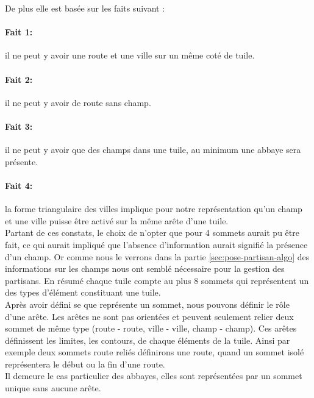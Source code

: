 \documentclass[a4paper, 11pt]{article}
\begin{document}
            De plus elle est basée sur les faits suivant : 
			\paragraph{Fait 1:}il ne peut y avoir une route et une ville sur un même coté de tuile.
			\paragraph{Fait 2:}il ne peut y avoir de route sans champ.
			\paragraph{Fait 3:}il ne peut y avoir que des champs dans une tuile, au minimum une abbaye sera présente.
			\paragraph{Fait 4:}la forme triangulaire des villes implique pour notre représentation qu'un champ et une ville puisse être activé sur la même arête d'une tuile.\\

			
			\indent Partant de ces constats, le choix de n'opter que pour 4 sommets aurait pu être fait, ce qui aurait impliqué que l'absence d'information aurait signifié la présence d'un champ. Or comme nous le verrons dans la partie \ref{sec:pose-partisan-algo} des informations sur les champs nous ont semblé nécessaire pour la gestion des partisans. En résumé chaque tuile compte au plus 8 sommets qui représentent un des types d'élément constituant une tuile.  \\

			\indent Après avoir défini se que représente un sommet, nous pouvons définir le rôle d'une arête. Les arêtes ne sont pas orientées et peuvent seulement relier deux sommet de même type (route - route, ville - ville, champ - champ). Ces arêtes définissent les limites, les contours, de chaque éléments de la tuile. Ainsi par exemple deux sommets route reliés définirons une route, quand un sommet isolé représentera le début ou la fin d'une route.\\
			
			\indent Il demeure le cas particulier des abbayes, elles sont représentées par un sommet unique sans aucune arête. 
\end{document}
